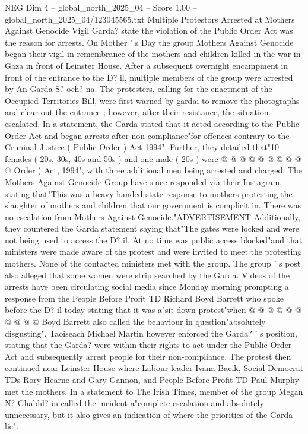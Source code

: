 \begin{textsample}{NEG Dim 4 – global\_north\_2025\_04 – Score 1.00 – global\_north\_2025\_04/123045565.txt}  \label{ex:f4_neg_244}
Multiple Protestors Arrested at Mothers Against Genocide Vigil Garda? state the violation of the Public Order Act was the reason for arrests.
On Mother ' s Day the group Mothers Against Genocide began their vigil in remembrance of the mothers and children killed in the war in Gaza in front of Leinster House.
After a subsequent overnight encampment in front of the entrance to the D? il, multiple members of the group were arrested by An Garda S? och? na.
The protesters, calling for the enactment of the Occupied Territories Bill, were first warned by gardai to remove the photographs and clear out the entrance ; however, after their resistance, the situation escalated.
In a statement, the Garda stated that it acted according to the Public Order Act and began arrests after non-compliance"for offences contrary to the Criminal Justice ( Public Order ) Act 1994".
Further, they detailed that"10 females ( 20s, 30s, 40s and 50s ) and one male ( 20s ) were @ @ @ @ @ @ @ @ @ @ Order ) Act, 1994", with three additional men being arrested and charged.
The Mothers Against Genocide Group have since responded via their Instagram, stating that"This was a heavy-handed state response to mothers protesting the slaughter of mothers and children that our government is complicit in.
There was no escalation from Mothers Against Genocide."ADVERTISEMENT Additionally, they countered the Garda statement saying that"The gates were locked and were not being used to access the D? il.
At no time was public access blocked"and that ministers were made aware of the protest and were invited to meet the protesting mothers.
None of the contacted ministers met with the group.
The group ' s post also alleged that some women were strip searched by the Garda.
Videos of the arrests have been circulating social media since Monday morning prompting a response from the People Before Profit TD Richard Boyd Barrett who spoke before the D? il today stating that it was a"sit down protest"when @ @ @ @ @ @ @ @ @ @ Boyd Barrett also called the behaviour in question"absolutely disgusting".
Taoiseach Michael Martin however enforced the Garda? ' s position, stating that the Garda? were within their rights to act under the Public Order Act and subsequently arrest people for their non-compliance.
The protest then continued near Leinster House where Labour leader Ivana Bacik, Social Democrat TDs Rory Hearne and Gary Gannon, and People Before Profit TD Paul Murphy met the mothers.
In a statement to The Irish Times, member of the group Megan N?
Ghabhl? in called the incident a"complete escalation and absolutely unnecessary, but it also gives an indication of where the priorities of the Garda lie".

\end{textsample}
